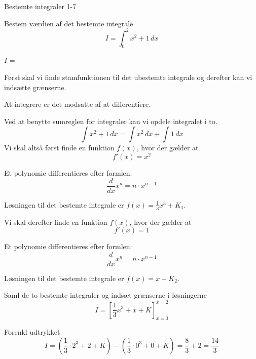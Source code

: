\documentclass{article}
\begin{document}
\newpage

\begin{exercise}{Bestemte integraler 1-7}

Bestem værdien af det bestemte integrale
\[
I = \int_0^2 x^2 + 1 \, dx
\]

$I$ = 


\hint
Først skal vi finde stamfunktionen til det ubestemte integrale og derefter kan vi indsætte grænserne.

\hint
At integrere er det modsatte af at differentiere.

\hint

Ved at benytte sumreglen for integraler kan vi opdele integralet i to.
\[
\int x^2+ 1 \, dx = \int x^2 \,dx + \int 1 \, dx
\]
\hint
Vi skal altså først finde en funktion $f(x)$, hvor der gælder at
\[
f'(x) = x^2
\]

\hint
Et polynomie differentieres efter formlen:
\[
\frac{d}{dx} x^n = n \cdot x^{n - 1}
\]

\hint
Løsningen til det bestemte integrale er $f(x) = \frac{1}{3} x^3 + K_1$.

\hint
Vi skal derefter finde en funktion $f(x)$, hvor der gælder at
\[
f'(x) = 1
\]

\hint
Et polynomie differentieres efter formlen:
\[
\frac{d}{dx} x^n = n \cdot x^{n - 1}
\]

\hint
Løsningen til det bestemte integrale er $f(x) = x + K_2$.



\hint
Saml de to bestemte integraler og indsæt grænserne i løsningerne
\[
I = \left[ \frac{1}{3} x^3 + x + K \right]_{x=0}^{x=2}
\]

\hint
Forenkl udtrykket
\[
I = \left( \frac{1}{3} \cdot 2^3 + 2+ K \right) - \left( \frac{1}{3} \cdot 0^3 + 0 + K \right) = \frac{8}{3} + 2 = \frac{14}{3}
\]


\end{exercise}

\newpage
\end{document}
